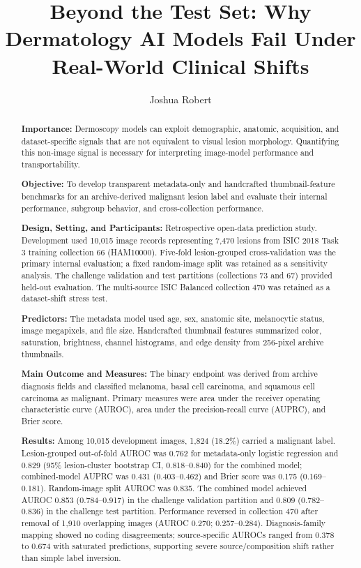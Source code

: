 \documentclass[11pt]{article}
\title{\textbf{Beyond the Test Set: Why Dermatology AI Models Fail Under Real-World Clinical Shifts}}
\author[1,2]{Joshua Robert}
\affil[1]{TAMU School of Engineering Medicine}
\affil[2]{Houston Methodist Hospital}
\date{}
\begin{document}
\maketitle

\begin{abstract}
\noindent\textbf{Importance:} Dermoscopy models can exploit demographic, anatomic, acquisition, and dataset-specific signals that are not equivalent to visual lesion morphology. Quantifying this non-image signal is necessary for interpreting image-model performance and transportability.

\noindent\textbf{Objective:} To develop transparent metadata-only and handcrafted thumbnail-feature benchmarks for an archive-derived malignant lesion label and evaluate their internal performance, subgroup behavior, and cross-collection performance.

\noindent\textbf{Design, Setting, and Participants:} Retrospective open-data prediction study. Development used 10,015 image records representing 7,470 lesions from ISIC 2018 Task 3 training collection 66 (HAM10000). Five-fold lesion-grouped cross-validation was the primary internal evaluation; a fixed random-image split was retained as a sensitivity analysis. The challenge validation and test partitions (collections 73 and 67) provided held-out evaluation. The multi-source ISIC Balanced collection 470 was retained as a dataset-shift stress test.

\noindent\textbf{Predictors:} The metadata model used age, sex, anatomic site, melanocytic status, image megapixels, and file size. Handcrafted thumbnail features summarized color, saturation, brightness, channel histograms, and edge density from 256-pixel archive thumbnails.

\noindent\textbf{Main Outcome and Measures:} The binary endpoint was derived from archive diagnosis fields and classified melanoma, basal cell carcinoma, and squamous cell carcinoma as malignant. Primary measures were area under the receiver operating characteristic curve (AUROC), area under the precision-recall curve (AUPRC), and Brier score.

\noindent\textbf{Results:} Among 10,015 development images, 1,824 (18.2\%) carried a malignant label. Lesion-grouped out-of-fold AUROC was 0.762 for metadata-only logistic regression and 0.829 (95\% lesion-cluster bootstrap CI, 0.818--0.840) for the combined model; combined-model AUPRC was 0.431 (0.403--0.462) and Brier score was 0.175 (0.169--0.181). Random-image split AUROC was 0.835. The combined model achieved AUROC 0.853 (0.784--0.917) in the challenge validation partition and 0.809 (0.782--0.836) in the challenge test partition. Performance reversed in collection 470 after removal of 1,910 overlapping images (AUROC 0.270; 0.257--0.284). Diagnosis-family mapping showed no coding disagreements; source-specific AUROCs ranged from 0.378 to 0.674 with saturated predictions, supporting severe source/composition shift rather than simple label inversion.


\end{abstract}
\end{document}
